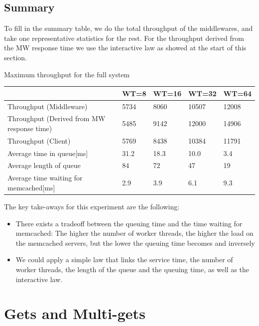 \documentclass[11pt,a4paper]{article}
\begin{document}
\subsection{Summary}
To fill in the summary table, we do the total throughput of the middlewares, and take one representative statistics for the rest. For the throughput derived from the MW response time we use the interactive law as showed at the start of this section. 
\begin{center}
	{Maximum throughput for the full system}
	\begin{tabular}{|l|p{1.5cm}|p{1.5cm}|p{1.5cm}|p{1.5cm}|}
		\hline                                            & WT=8 & WT=16 & WT=32 & WT=64 \\ 
		\hline Throughput (Middleware)                    &5734      &8060       &10507       &12008       \\ 
		\hline Throughput (Derived from MW response time) &5485      &9142       &12000       &14906       \\ 
		\hline Throughput (Client)                        &5769      &8438       &10384       &11791       \\ 
		\hline Average time in queue[ms]                      &31.2      &18.3       &10.0      &3.4       \\ 
		\hline Average length of queue                    &84      &72       &47       &19       \\ 
		\hline Average time waiting for memcached[ms]         &2.9      &3.9       &6.1       &9.3       \\ 
		\hline 
	\end{tabular}
\end{center}

The key take-aways for this experiment are the following: 
\begin{itemize}
\item There exists a tradeoff between the queuing time and the time waiting for memcached: The higher the number of worker threads, the higher the load on the memcached servers, but the lower the queuing time becomes and inversely
\item We could apply a simple law that links the service time, the number of worker threads, the length of the queue and the queuing time, as well as the interactive law. 
\end{itemize}
\newpage

\section{Gets and Multi-gets}
\end{document}

